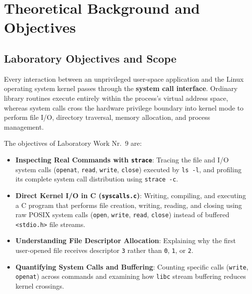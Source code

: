 \documentclass[12pt,a4paper]{article}
\begin{document}
\section{Theoretical Background and Objectives}

\subsection{Laboratory Objectives and Scope}
Every interaction between an unprivileged user-space application and the Linux operating system kernel passes through the \textbf{system call interface}. Ordinary library routines execute entirely within the process's virtual address space, whereas system calls cross the hardware privilege boundary into kernel mode to perform file I/O, directory traversal, memory allocation, and process management.

The objectives of Laboratory Work Nr.~9 are:
\begin{itemize}
    \item \textbf{Inspecting Real Commands with \texttt{strace}}: Tracing the file and I/O system calls (\texttt{openat}, \texttt{read}, \texttt{write}, \texttt{close}) executed by \texttt{ls -l}, and profiling its complete system call distribution using \texttt{strace -c}.
    \item \textbf{Direct Kernel I/O in C (\texttt{syscalls.c})}: Writing, compiling, and executing a C program that performs file creation, writing, reading, and closing using raw POSIX system calls (\texttt{open}, \texttt{write}, \texttt{read}, \texttt{close}) instead of buffered \texttt{<stdio.h>} file streams.
    \item \textbf{Understanding File Descriptor Allocation}: Explaining why the first user-opened file receives descriptor \texttt{3} rather than \texttt{0}, \texttt{1}, or \texttt{2}.
    \item \textbf{Quantifying System Calls and Buffering}: Counting specific calls (\texttt{write}, \texttt{openat}) across commands and examining how \texttt{libc} stream buffering reduces kernel crossings.
\end{itemize}
\end{document}
